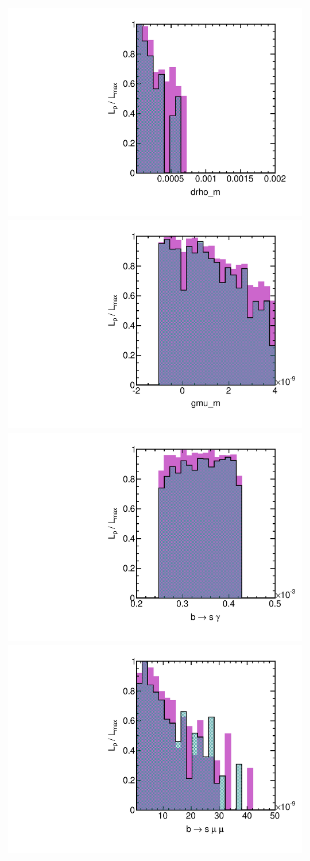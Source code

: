 \begin{figure}[htbp]
\begin{center}
\includegraphics[height=5.5cm]{figs/fig_drho_m.pdf} 
\includegraphics[height=5.5cm]{figs/fig_gmu_m.pdf} \\
\includegraphics[height=5.5cm]{figs/fig_bsgamma_m.pdf} 
\includegraphics[height=5.5cm]{figs/fig_bsmumu_m.pdf} \\

\end{center}
\end{figure}
